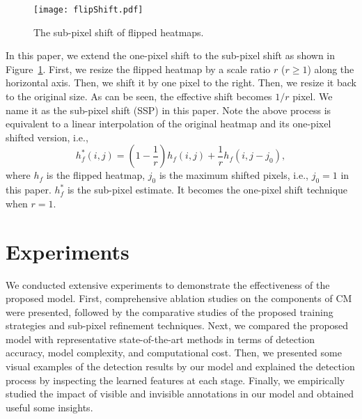 \documentclass[twocolumn]{svjour3}          \smartqed  \usepackage{natbib}
\begin{document}
\begin{figure}[t]
\centering
\texttt{[image: flipShift.pdf]}
\caption{The sub-pixel shift of flipped heatmaps.}
\label{fig:flipShift}
\end{figure}

In this paper, we extend the one-pixel shift to the sub-pixel shift as shown in Figure~\ref{fig:flipShift}. First, we resize the flipped heatmap by a scale ratio $r$ ($r\ge1$) along the horizontal axis. Then, we shift it by one pixel to the right. Then, we resize it back to the original size. As can be seen, the effective shift becomes $1/r$ pixel. We name it as the sub-pixel shift (SSP) in this paper. Note the above process is equivalent to a linear interpolation of the original heatmap and its one-pixel shifted version, i.e.,
\begin{equation}
h_{f}^*\left( {i,j} \right) = \left( {1 - \frac{1}{r}  } \right){h_{f}}\left( {i,j} \right) + \frac{1}{r} {h_{f}}\left( {i,j - j_0} \right),
\label{eq:shiftflip}
\end{equation}
where $h_{f}$ is the flipped heatmap, $j_0$ is the maximum shifted pixels, i.e., $j_0 = 1$ in this paper. $h_{f}^*$ is the sub-pixel estimate. It becomes the one-pixel shift technique when $r=1$.


\section{Experiments}
\label{sec:experiments}
We conducted extensive experiments to demonstrate the effectiveness of the proposed model. First, comprehensive ablation studies on the components of CM were presented, followed by the comparative studies of the proposed training strategies and sub-pixel refinement techniques. Next, we compared the proposed model with representative state-of-the-art methods in terms of detection accuracy, model complexity, and computational cost. Then, we presented some visual examples of the detection results by our model and explained the detection process by inspecting the learned features at each stage. Finally, we empirically studied the impact of visible and invisible annotations in our model and obtained useful some insights. 
\end{document}
